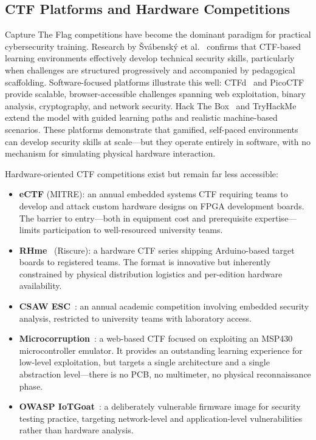 \subsection{CTF Platforms and Hardware Competitions}\label{subsec:ctf}

Capture The Flag competitions have become the dominant paradigm for practical cybersecurity training. Research by \v{S}v\'{a}bensk\'{y} et al.~\cite{svabensky2020} confirms that CTF-based learning environments effectively develop technical security skills, particularly when challenges are structured progressively and accompanied by pedagogical scaffolding. Software-focused platforms illustrate this well: CTFd~\cite{ctfd} and PicoCTF~\cite{picoctf} provide scalable, browser-accessible challenges spanning web exploitation, binary analysis, cryptography, and network security. Hack The Box~\cite{hackthebox} and TryHackMe~\cite{tryhackme} extend the model with guided learning paths and realistic machine-based scenarios. These platforms demonstrate that gamified, self-paced environments can develop security skills at scale---but they operate entirely in software, with no mechanism for simulating physical hardware interaction.

Hardware-oriented CTF competitions exist but remain far less accessible:
\begin{itemize}
    \item \textbf{eCTF} (MITRE): an annual embedded systems CTF requiring teams to develop and attack custom hardware designs on FPGA development boards. The barrier to entry---both in equipment cost and prerequisite expertise---limits participation to well-resourced university teams.
    \item \textbf{RHme}~\cite{rhme} (Riscure): a hardware CTF series shipping Arduino-based target boards to registered teams. The format is innovative but inherently constrained by physical distribution logistics and per-edition hardware availability.
    \item \textbf{CSAW ESC}~\cite{csawesc}: an annual academic competition involving embedded security analysis, restricted to university teams with laboratory access.
    \item \textbf{Microcorruption}~\cite{microcorruption}: a web-based CTF focused on exploiting an MSP430 microcontroller emulator. It provides an outstanding learning experience for low-level exploitation, but targets a single architecture and a single abstraction level---there is no PCB, no multimeter, no physical reconnaissance phase.
    \item \textbf{OWASP IoTGoat}~\cite{iotgoat}: a deliberately vulnerable firmware image for security testing practice, targeting network-level and application-level vulnerabilities rather than hardware analysis.
\end{itemize}

